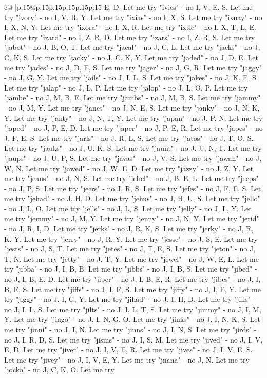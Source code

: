 \documentclass{article}
\begin{document}
{\begin{supertabular}{c@{$\;$}|p{.15\linewidth}@{}p{.15\linewidth}p{.15\linewidth}p{.15\linewidth}p{.15\linewidth}p{.15\linewidth}}
{{{E, D. Let me try "ivies" {-} no I, V, E, S. Let me try "ivory" {-} no I, V, R, Y. Let me try "ixias" {-} no I, X, S. Let me try "ixnay" {-} no I, X, N, Y. Let me try "ixora" {-} no I, X, R. Let me try "ixtle" {-} no I, X, T, L, E. Let me try "izard" {-} no I, Z, R, D. Let me try "izars" {-} no I, Z, R, S. Let me try "jabot" {-} no J, B, O, T. Let me try "jacal" {-} no J, C, L. Let me try "jacks" {-} no J, C, K, S. Let me try "jacky" {-} no J, C, K, Y. Let me try "jaded" {-} no J, D, E. Let me try "jades" {-} no J, D, E, S. Let me try "jager" {-} no J, G, R. Let me try "jaggy" {-} no J, G, Y. Let me try "jails" {-} no J, I, L, S. Let me try "jakes" {-} no J, K, E, S. Let me try "jalap" {-} no J, L, P. Let me try "jalop" {-} no J, L, O, P. Let me try "jambe" {-} no J, M, B, E. Let me try "jambs" {-} no J, M, B, S. Let me try "jammy" {-} no J, M, Y. Let me try "janes" {-} no J, N, E, S. Let me try "janky" {-} no J, N, K, Y. Let me try "janty" {-} no J, N, T, Y. Let me try "japan" {-} no J, P, N. Let me try "japed" {-} no J, P, E, D. Let me try "japer" {-} no J, P, E, R. Let me try "japes" {-} no J, P, E, S. Let me try "jarls" {-} no J, R, L, S. Let me try "jatos" {-} no J, T, O, S. Let me try "jauks" {-} no J, U, K, S. Let me try "jaunt" {-} no J, U, N, T. Let me try "jaups" {-} no J, U, P, S. Let me try "javas" {-} no J, V, S. Let me try "jawan" {-} no J, W, N. Let me try "jawed" {-} no J, W, E, D. Let me try "jazzy" {-} no J, Z, Y. Let me try "jeans" {-} no J, N, S. Let me try "jebel" {-} no J, B, E, L. Let me try "jeeps" {-} no J, P, S. Let me try "jeers" {-} no J, R, S. Let me try "jefes" {-} no J, F, E, S. Let me try "jehad" {-} no J, H, D. Let me try "jehus" {-} no J, H, U, S. Let me try "jello" {-} no J, L, O. Let me try "jells" {-} no J, L, S. Let me try "jelly" {-} no J, L, Y. Let me try "jemmy" {-} no J, M, Y. Let me try "jenny" {-} no J, N, Y. Let me try "jerid" {-} no J, R, I, D. Let me try "jerks" {-} no J, R, K, S. Let me try "jerky" {-} no J, R, K, Y. Let me try "jerry" {-} no J, R, Y. Let me try "jesse" {-} no J, S, E. Let me try "jests" {-} no J, S, T. Let me try "jetes" {-} no J, T, E, S. Let me try "jeton" {-} no J, T, N. Let me try "jetty" {-} no J, T, Y. Let me try "jewel" {-} no J, W, E, L. Let me try "jibba" {-} no J, I, B, B. Let me try "jibbs" {-} no J, I, B, S. Let me try "jibed" {-} no J, I, B, E, D. Let me try "jiber" {-} no J, I, B, E, R. Let me try "jibes" {-} no J, I, B, E, S. Let me try "jiffs" {-} no J, I, F, S. Let me try "jiffy" {-} no J, I, F, Y. Let me try "jiggy" {-} no J, I, G, Y. Let me try "jihad" {-} no J, I, H, D. Let me try "jills" {-} no J, I, L, S. Let me try "jilts" {-} no J, I, L, T, S. Let me try "jimmy" {-} no J, I, M, Y. Let me try "jingo" {-} no J, I, N, G, O. Let me try "jinks" {-} no J, I, N, K, S. Let me try "jinni" {-} no J, I, N. Let me try "jinns" {-} no J, I, N, S. Let me try "jirds" {-} no J, I, R, D, S. Let me try "jisms" {-} no J, I, S, M. Let me try "jived" {-} no J, I, V, E, D. Let me try "jiver" {-} no J, I, V, E, R. Let me try "jives" {-} no J, I, V, E, S. Let me try "jivey" {-} no J, I, V, E, Y. Let me try "jnana" {-} no J, N. Let me try "jocko" {-} no J, C, K, O. Let me try }}}
\end{supertabular}}
\end{document}
